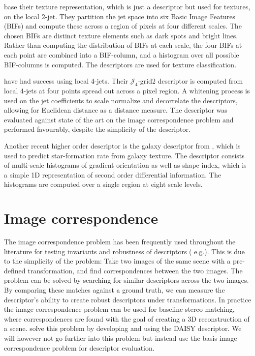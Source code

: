 \documentclass[thesis.tex]{subfiles}
\begin{document}
\citet{crosier2010using} base their texture representation, which is just a descriptor but used for textures, on the local $2$-jet. They partition the jet space into six Basic Image Features (BIFs) and compute these across a region of pixels at four different scales. The chosen BIFs are distinct texture elements such as dark spots and bright lines. Rather than computing the distribution of BIFs at each scale, the four BIFs at each point are combined into a BIF-column, and a histogram over all possible BIF-columns is computed. The descriptors are used for texture classification.

\citet{larsen2012jet} have had success using local 4-jets. Their $\mathcal{J}_4$-grid2 descriptor is computed from local 4-jets at four points spread out across a pixel region. A whitening process is used on the jet coefficients to scale normalize and decorrelate the descriptors, allowing for Euclidean distance as a distance measure. The descriptor was evaluated against state of the art on the image correspondence problem and performed favourably, despite the simplicity of the descriptor.

Another recent higher order descriptor is the galaxy descriptor from \citet{pedersen2013shape}, which is used to predict star-formation rate from galaxy texture. The descriptor consists of multi-scale histograms of gradient orientation as well as shape index, which is a simple 1D representation of second order differential information. The histograms are computed over a single region at eight scale levels.
%
\section{Image correspondence}
%
The image correspondence problem has been frequently used throughout the literature for testing invariants and robustness of descriptors (\cite{lowe2004distinctive,mikolajczyk2005performance,ke2004pca,larsen2012jet,cui2009scale,toews2009sift} e.g.). This is due to the simplicity of the problem: Take two images of the same scene with a pre-defined transformation, and find correspondences between the two images. The problem can be solved by searching for similar descriptors across the two images. By comparing these matches against a ground truth, we can measure the descriptor's ability to create robust descriptors under transformations. In practice the image correspondence problem can be used for baseline stereo matching, where correspondences are found with the goal of creating a 3D reconstruction of a scene. \citet{tola2008fast} solve this problem by developing and using the DAISY descriptor. We will however not go further into this problem but instead use the basis image correspondence problem for descriptor evaluation.
\end{document}
